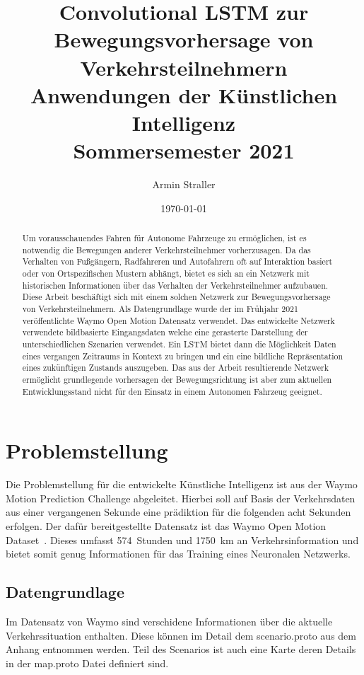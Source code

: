 \documentclass[12pt]{article}
\begin{document}
\title{%
Convolutional LSTM zur Bewegungsvorhersage von Verkehrsteilnehmern \\
  \large Anwendungen der Künstlichen Intelligenz \\
    Sommersemester 2021}
\author{Armin Straller}
\date{\today}

\maketitle

\begin{abstract}
    Um vorausschauendes Fahren für Autonome Fahrzeuge zu ermöglichen, ist es notwendig die Bewegungen anderer Verkehrsteilnehmer vorherzusagen. 
    Da das Verhalten von Fußgängern, Radfahreren und Autofahrern oft auf Interaktion basiert oder von Ortspezifischen Mustern abhängt, 
    bietet es sich an ein Netzwerk mit historischen Informationen über das Verhalten der Verkehrsteilnehmer aufzubauen.
	Diese Arbeit beschäftigt sich mit einem solchen Netzwerk zur Bewegungsvorhersage von Verkehrsteilnehmern.
    Als Datengrundlage wurde der im Frühjahr 2021 veröffentlichte Waymo Open Motion Datensatz verwendet. 
    Das entwickelte Netzwerk verwendete bildbasierte Eingangsdaten welche eine gerasterte Darstellung der unterschiedlichen Szenarien verwendet.
    Ein LSTM bietet dann die Möglichkeit Daten eines vergangen Zeitraums in Kontext zu bringen und ein eine bildliche Repräsentation eines zukünftigen Zustands auszugeben. 
    Das aus der Arbeit resultierende Netzwerk ermöglicht grundlegende vorhersagen der Bewegungsrichtung ist aber zum aktuellen Entwicklungsstand nicht für den Einsatz in einem Autonomen Fahrzeug geeignet.
\end{abstract}

\section{Problemstellung}
    Die Problemstellung für die entwickelte Künstliche Intelligenz ist aus der Waymo Motion Prediction Challenge abgeleitet.
    Hierbei soll auf Basis der Verkehrsdaten aus einer vergangenen Sekunde eine prädiktion für die folgenden acht Sekunden erfolgen.
    Der dafür bereitgestellte Datensatz ist das Waymo Open Motion Dataset~\cite{ettinger2021large}. 
    Dieses umfasst 574~Stunden und 1750~km an Verkehrsinformation und bietet somit genug Informationen für das Training eines Neuronalen Netzwerks.

    \subsection{Datengrundlage}
        Im Datensatz von Waymo sind verschidene Informationen über die aktuelle Verkehrssituation enthalten. Diese können im Detail dem scenario.proto aus dem Anhang entnommen werden.
        Teil des Scenarios ist auch eine Karte deren Details in der map.proto Datei definiert sind.~\cite{waymo2021github}
\end{document}
